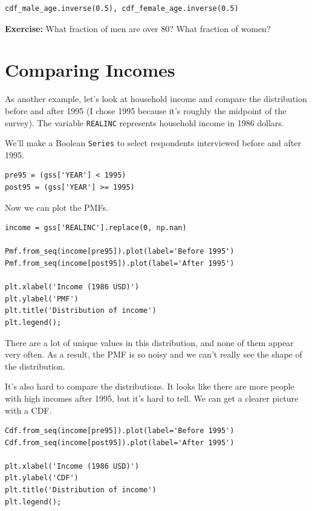\begin{lstlisting}[]
cdf_male_age.inverse(0.5), cdf_female_age.inverse(0.5)
\end{lstlisting}

\textbf{Exercise:} What fraction of men are over 80? What fraction of
women?

\hypertarget{comparing-incomes}{%
\section{Comparing Incomes}\label{comparing-incomes}}

As another example, let's look at household income and compare the
distribution before and after 1995 (I chose 1995 because it's roughly
the midpoint of the survey). The variable
\passthrough{\lstinline!REALINC!} represents household income in 1986
dollars.

We'll make a Boolean \passthrough{\lstinline!Series!} to select
respondents interviewed before and after 1995.

\begin{lstlisting}[]
pre95 = (gss['YEAR'] < 1995)
post95 = (gss['YEAR'] >= 1995)
\end{lstlisting}

Now we can plot the PMFs.

\begin{lstlisting}[]
income = gss['REALINC'].replace(0, np.nan)

Pmf.from_seq(income[pre95]).plot(label='Before 1995')
Pmf.from_seq(income[post95]).plot(label='After 1995')

plt.xlabel('Income (1986 USD)')
plt.ylabel('PMF')
plt.title('Distribution of income')
plt.legend();
\end{lstlisting}

There are a lot of unique values in this distribution, and none of them
appear very often. As a result, the PMF is so noisy and we can't really
see the shape of the distribution.

It's also hard to compare the distributions. It looks like there are
more people with high incomes after 1995, but it's hard to tell. We can
get a clearer picture with a CDF.

\begin{lstlisting}[]
Cdf.from_seq(income[pre95]).plot(label='Before 1995')
Cdf.from_seq(income[post95]).plot(label='After 1995')

plt.xlabel('Income (1986 USD)')
plt.ylabel('CDF')
plt.title('Distribution of income')
plt.legend();
\end{lstlisting}

